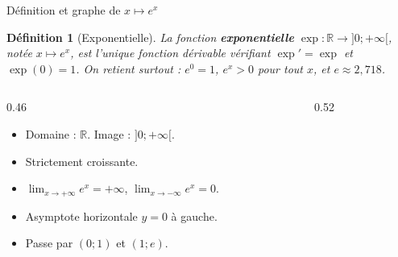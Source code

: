 \documentclass[10pt,aspectratio=169]{beamer}
\newcounter{dummy}
\numberwithin{dummy}{section}
\newtheorem{mydef}[dummy]{Définition}
\newcommand{\R}{\mathbb{R}}
\begin{document}
\begin{frame}{Définition et graphe de $x\mapsto e^x$}
\begin{mydef}[Exponentielle]
La fonction \textbf{exponentielle} $\exp: \R\to ]0;+\infty[$, notée $x\mapsto e^x$,
est l'unique fonction dérivable vérifiant $\exp'=\exp$ et $\exp(0)=1$.
On retient surtout : $e^0=1$, $e^x>0$ pour tout $x$, et $e\approx 2{,}718$.
\end{mydef}

\begin{columns}[T]
\begin{column}{0.46\textwidth}
\begin{itemize}
    \item Domaine : $\R$. Image : $]0;+\infty[$.
    \item Strictement croissante.
    \item $\displaystyle\lim_{x\to+\infty}e^x=+\infty$,
          $\displaystyle\lim_{x\to-\infty}e^x=0$.
    \item Asymptote horizontale $y=0$ à gauche.
    \item Passe par $(0;1)$ et $(1;e)$.
\end{itemize}
\end{column}
\begin{column}{0.52\textwidth}
\centering
{}
\end{column}
\end{columns}
\end{frame}
\end{document}
